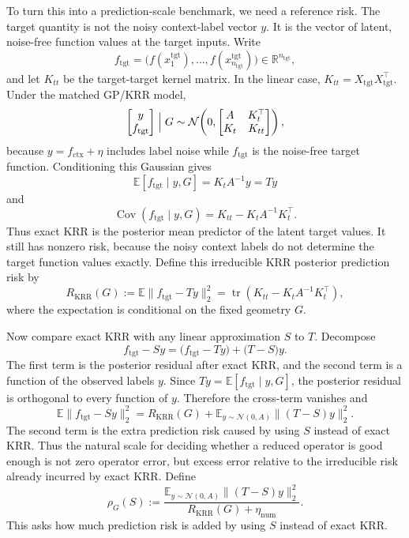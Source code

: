 \documentclass[11pt]{article}
\newcommand{\R}{\mathbb{R}}
\begin{document}
To turn this into a prediction-scale benchmark, we need a reference risk. The target quantity is not
the noisy context-label vector \(y\). It is the vector of latent, noise-free function values at the
target inputs. Write
\[
f_{\mathrm{tgt}}
=
\bigl(f(x^{\mathrm{tgt}}_1),\ldots,f(x^{\mathrm{tgt}}_{n_{\mathrm{tgt}}})\bigr)
\in\R^{n_{\mathrm{tgt}}},
\]
and let \(K_{tt}\) be the target-target kernel matrix. In the linear case,
\(K_{tt}=X_{\mathrm{tgt}}X_{\mathrm{tgt}}^\top\). Under the matched GP/KRR model,
\[
\begin{bmatrix}
y\\
f_{\mathrm{tgt}}
\end{bmatrix}
\Bigm|G
\sim
\mathcal{N}\!\left(
0,
\begin{bmatrix}
A & K_t^\top\\
K_t & K_{tt}
\end{bmatrix}
\right),
\]
because \(y=f_{\mathrm{ctx}}+\eta\) includes label noise while \(f_{\mathrm{tgt}}\) is the
noise-free target function. Conditioning this Gaussian gives
\[
\mathbb{E}[f_{\mathrm{tgt}}\mid y,G]=K_tA^{-1}y=Ty
\]
and
\[
\operatorname{Cov}(f_{\mathrm{tgt}}\mid y,G)
=
K_{tt}-K_tA^{-1}K_t^\top .
\]
Thus exact KRR is the posterior mean predictor of the latent target values. It still has nonzero
risk, because the noisy context labels do not determine the target function values exactly. Define
this irreducible KRR posterior prediction risk by
\[
R_{\mathrm{KRR}}(G)
:=
\mathbb{E}\|f_{\mathrm{tgt}}-Ty\|_2^2
=
\operatorname{tr}\!\left(K_{tt}-K_tA^{-1}K_t^\top\right),
\]
where the expectation is conditional on the fixed geometry \(G\).

Now compare exact KRR with any linear approximation \(S\) to \(T\). Decompose
\[
f_{\mathrm{tgt}}-Sy
=
\bigl(f_{\mathrm{tgt}}-Ty\bigr)
+
\bigl(T-S\bigr)y.
\]
The first term is the posterior residual after exact KRR, and the second term is a function of the
observed labels \(y\). Since \(Ty=\mathbb{E}[f_{\mathrm{tgt}}\mid y,G]\), the posterior residual is
orthogonal to every function of \(y\). Therefore the cross-term vanishes and
\[
\mathbb{E}\|f_{\mathrm{tgt}}-Sy\|_2^2
=
R_{\mathrm{KRR}}(G)
+
\mathbb{E}_{y\sim\mathcal{N}(0,A)}\|(T-S)y\|_2^2.
\]
The second term is the extra prediction risk caused by using \(S\) instead of exact KRR. Thus the
natural scale for deciding whether a reduced operator is good enough is not zero operator error, but
excess error relative to the irreducible risk already incurred by exact KRR. Define
\[
\rho_G(S)
:=
\frac{
\mathbb{E}_{y\sim\mathcal{N}(0,A)}\|(T-S)y\|_2^2
}{
R_{\mathrm{KRR}}(G)+\eta_{\mathrm{num}}
}.
\]
This asks how much prediction risk is added by using \(S\) instead of exact KRR.
\end{document}
